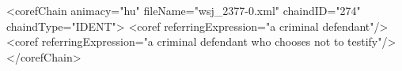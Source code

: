 <corefChain animacy="hu" fileName="wsj_2377-0.xml" chaindID="274" chaindType="IDENT">
    <coref referringExpression="a criminal defendant"/>
    <coref referringExpression="a criminal defendant who chooses not to testify"/>
</corefChain>